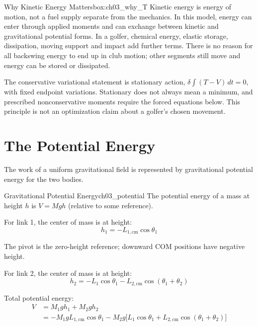 \begin{laymansbox}{Why Kinetic Energy Matters}{box:ch03_why_T}
Kinetic energy is energy of motion, not a fuel supply separate from the mechanics. In this model, energy can enter through applied moments and can exchange between kinetic and gravitational potential forms. In a golfer, chemical energy, elastic storage, dissipation, moving support and impact add further terms. There is no reason for all backswing energy to end up in club motion; other segments still move and energy can be stored or dissipated.

The conservative variational statement is stationary action, $\delta\int(T-V)\,dt=0$, with fixed endpoint variations. Stationary does not always mean a minimum, and prescribed nonconservative moments require the forced equations below. This principle is not an optimization claim about a golfer's chosen movement.
\end{laymansbox}

\section{The Potential Energy}

The work of a uniform gravitational field is represented by gravitational potential energy for the two bodies.

\begin{definition}{Gravitational Potential Energy}{ch03_potential}
The potential energy of a mass at height $h$ is $V = Mgh$ (relative to some reference).
\end{definition}

For link 1, the center of mass is at height:
\begin{equation}
h_1 = -L_{1,\text{cm}} \cos \theta_1
\label{eq:ch03_h1}
\end{equation}

The pivot is the zero-height reference; downward COM positions have negative height.

For link 2, the center of mass is at height:
\begin{equation}
h_2 = -L_1 \cos \theta_1 - L_{2,\text{cm}} \cos(\theta_1 + \theta_2)
\label{eq:ch03_h2}
\end{equation}

Total potential energy:
\begin{align}
V &= M_1 g h_1 + M_2 g h_2 \\
&= -M_1 g L_{1,\text{cm}} \cos \theta_1 - M_2 g \big[ L_1 \cos \theta_1 + L_{2,\text{cm}} \cos(\theta_1 + \theta_2) \big]
\label{eq:ch03_V_total}
\end{align}


